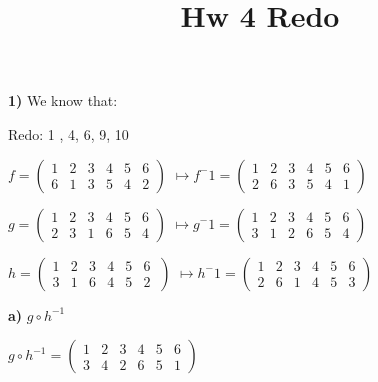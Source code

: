 \documentclass{article}
\title{Hw 4 Redo}
\date{}
\begin{document}
\maketitle

\textbf{1)} 
We know that:

Redo: 1 , 4, 6, 9, 10

\medskip


$f=(\begin{smallmatrix} 
1 & 2 & 3 & 4 & 5 & 6 \\ 
6 & 1 & 3 & 5 & 4 &2
\end{smallmatrix}) $
				$ \mapsto f^-1=(\begin{smallmatrix} 
				1 & 2 & 3 & 4 & 5 & 6 \\ 
				2 & 6 & 3 & 5 & 4 &1
				\end{smallmatrix}) $ 			

\bigskip
 


$ g=(\begin{smallmatrix} 
1 & 2 & 3 & 4 & 5 & 6 \\									
2 & 3 & 1 & 6 & 5 & 4
\end{smallmatrix}) $
				$ \mapsto g^-1=(\begin{smallmatrix} 
				1 & 2 & 3 & 4 & 5 & 6 \\									
				3 & 1 & 2 & 6 & 5 & 4
				\end{smallmatrix}) $
					
	
\bigskip

	



$h=(\begin{smallmatrix} 
1 & 2 & 3 & 4 & 5 & 6 \\
3 & 1 & 6 & 4 & 5 & 2
\end{smallmatrix}\ )$
					$\mapsto h^-1=(\begin{smallmatrix}
					1 & 2 & 3 & 4 & 5 & 6 \\
					2 & 6 & 1 & 4 & 5 & 3
					\end{smallmatrix})$	

\bigskip

\hspace{.2in}\textbf{a)} $g \circ h^{-1}$

\medskip

$g  \circ  h^{-1}=(\begin{smallmatrix}
1 & 2 & 3 & 4 & 5 & 6 \\	
3 & 4 & 2 & 6 & 5 & 1
\end{smallmatrix})$
\end{document}

